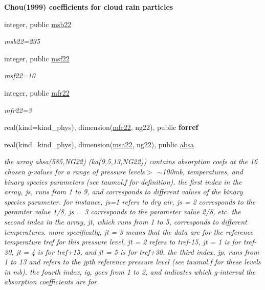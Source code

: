 \begin{Indent}\textbf{ Chou(1999) coefficients for cloud rain particles}\par
\begin{DoxyCompactItemize}
\item 
integer, public \hyperlink{group__module__radsw__kgbnn_ga3398f8d12ec0349b44197873ac58fd98}{msb22}
\begin{DoxyCompactList}\small\item\em msb22=235 \end{DoxyCompactList}\item 
integer, public \hyperlink{group__module__radsw__kgbnn_ga0903a020c9e4a4f7c21911d2ab98fd46}{msf22}
\begin{DoxyCompactList}\small\item\em msf22=10 \end{DoxyCompactList}\item 
integer, public \hyperlink{group__module__radsw__kgbnn_ga0afe8facbe4837a22c96a0d2000a20ee}{mfr22}
\begin{DoxyCompactList}\small\item\em mfr22=3 \end{DoxyCompactList}\item 
real(kind=kind\+\_\+phys), dimension(\hyperlink{group__module__radsw__kgbnn_ga0afe8facbe4837a22c96a0d2000a20ee}{mfr22}, ng22), public {\bfseries forref}
\item 
real(kind=kind\+\_\+phys), dimension(\hyperlink{namespacemodule__radsw__kgb22_a4134c2cd3b31db5e0adb5c3c2ad87905}{msa22}, ng22), public \hyperlink{group__module__radsw__kgbnn_ga15ed79e7136ed6d7f11c19a81281af53}{absa}
\begin{DoxyCompactList}\small\item\em the array absa(585,\+N\+G22) (ka(9,5,13,\+N\+G22)) contains absorption coefs at the 16 chosen g-\/values for a range of pressure levels$>$ $\sim$100mb, temperatures, and binary species parameters (see taumol.\+f for definition). the first index in the array, js, runs from 1 to 9, and corresponds to different values of the binary species parameter. for instance, js=1 refers to dry air, js = 2 corresponds to the paramter value 1/8, js = 3 corresponds to the parameter value 2/8, etc. the second index in the array, jt, which runs from 1 to 5, corresponds to different temperatures. more specifically, jt = 3 means that the data are for the reference temperature tref for this pressure level, jt = 2 refers to tref-\/15, jt = 1 is for tref-\/30, jt = 4 is for tref+15, and jt = 5 is for tref+30. the third index, jp, runs from 1 to 13 and refers to the jpth reference pressure level (see taumol.\+f for these levels in mb). the fourth index, ig, goes from 1 to 2, and indicates which g-\/interval the absorption coefficients are for. \end{DoxyCompactList}\item 

\end{DoxyCompactItemize}
\end{Indent}
